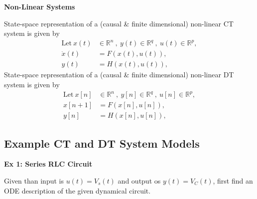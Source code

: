 \documentclass[twoside]{article}
\begin{document}
\textbf{Non-Linear Systems}

State-space representation of a (causal \& finite dimensional) non-linear CT system is given by
%
\begin{align*}
  \mathrm{Let} \ x(t) &\in \mathbb{R}^n \ , \ y(t) \in \mathbb{R}^q \ ,\  u(t) \in
  \mathbb{R}^p , \\
  \dot{x}(t) &= F(x(t),u(t)) , \\
  y(t) &= H(x(t),u(t)) , 
\end{align*}
%
State-space representation of a (causal \& finite dimensional) non-linear DT system is given by
%
\begin{align*}
  \mathrm{Let} \ x[n] &\in \mathbb{R}^n \ , \ y[n] \in \mathbb{R}^q \ ,\
                        u[n] \in \mathbb{R}^p , \\
  x[n+1] &= F(x[n],u[n]) , \\
  y[n] &= H(x[n],u[n]) , 
\end{align*}

\subsection{Example CT and DT System Models}

\textbf{Ex 1: Series RLC Circuit}

Given than input is $u(t) = V_s(t)$ and output os $y(t) = V_C(t)$,
first find an ODE description of the given dynamical circuit. 
\end{document}
